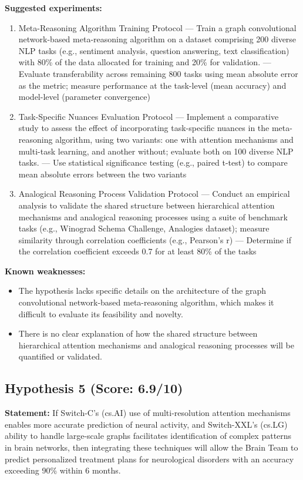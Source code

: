 \documentclass[12pt,a4paper]{article}
\begin{document}
\textbf{Suggested experiments:}
\begin{enumerate}
  \item Meta-Reasoning Algorithm Training Protocol — Train a graph convolutional network-based meta-reasoning algorithm on a dataset comprising 200 diverse NLP tasks (e.g., sentiment analysis, question answering, text classification) with 80\% of the data allocated for training and 20\% for validation. — Evaluate transferability across remaining 800 tasks using mean absolute error as the metric; measure performance at the task-level (mean accuracy) and model-level (parameter convergence)
  \item Task-Specific Nuances Evaluation Protocol — Implement a comparative study to assess the effect of incorporating task-specific nuances in the meta-reasoning algorithm, using two variants: one with attention mechanisms and multi-task learning, and another without; evaluate both on 100 diverse NLP tasks. — Use statistical significance testing (e.g., paired t-test) to compare mean absolute errors between the two variants
  \item Analogical Reasoning Process Validation Protocol — Conduct an empirical analysis to validate the shared structure between hierarchical attention mechanisms and analogical reasoning processes using a suite of benchmark tasks (e.g., Winograd Schema Challenge, Analogies dataset); measure similarity through correlation coefficients (e.g., Pearson's r) — Determine if the correlation coefficient exceeds 0.7 for at least 80\% of the tasks
\end{enumerate}

\textbf{Known weaknesses:}
\begin{itemize}
  \item The hypothesis lacks specific details on the architecture of the graph convolutional network-based meta-reasoning algorithm, which makes it difficult to evaluate its feasibility and novelty.
  \item There is no clear explanation of how the shared structure between hierarchical attention mechanisms and analogical reasoning processes will be quantified or validated.
\end{itemize}
\subsection*{Hypothesis 5 (Score: 6.9/10)}

\textbf{Statement:} If Switch-C's (cs.AI) use of multi-resolution attention mechanisms enables more accurate prediction of neural activity, and Switch-XXL's (cs.LG) ability to handle large-scale graphs facilitates identification of complex patterns in brain networks, then integrating these techniques will allow the Brain Team to predict personalized treatment plans for neurological disorders with an accuracy exceeding 90\% within 6 months.
\end{document}
